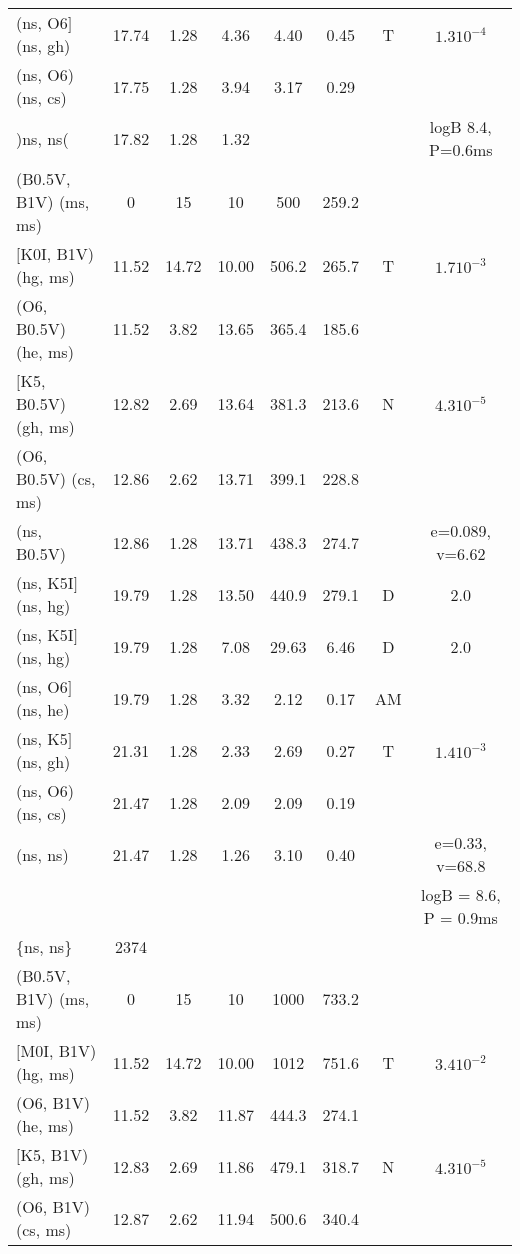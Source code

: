 \documentclass{article}
\begin{document}
\begin{table}
\begin{tabular}{p{4cm}ccccccc}
(ns, O6$]$ (ns, gh)	& 17.74	& 1.28	& 4.36 	& 4.40  & 0.45 	& T	& $1.3 10^{-4}$		\\
(ns, O6) (ns, cs)	& 17.75	& 1.28	& 3.94 	& 3.17  & 0.29 	&  	&               	\\
)ns, ns(         	& 17.82	& 1.28	& 1.32 	&       &      	&  	& logB 8.4, P=0.6ms	\\
\hline
(B0.5V, B1V) (ms, ms)	& 0	& 15	& 10	& 500	& 259.2	&       &			\\
$[$K0I, B1V) (hg, ms)	& 11.52	& 14.72	& 10.00	& 506.2 & 265.7 & T	& $1.7 10^{-3}$		\\
(O6, B0.5V) (he, ms)	& 11.52	& 3.82	& 13.65	& 365.4	& 185.6	&  	&               	\\
$[$K5, B0.5V) (gh, ms)	& 12.82	& 2.69	& 13.64	& 381.3	& 213.6	& N	& $4.3 10^{-5}$		\\
(O6, B0.5V) (cs, ms)	& 12.86	& 2.62	& 13.71	& 399.1	& 228.8	&  	&              		\\
(ns, B0.5V)         	& 12.86	& 1.28	& 13.71	& 438.3	& 274.7	&  	&  e=0.089, v=6.62	\\
(ns, K5I$]$ (ns, hg)	& 19.79	& 1.28	& 13.50	& 440.9 & 279.1	& D	& 2.0         		\\
(ns, K5I$]$ (ns, hg)	& 19.79	& 1.28	& 7.08 	& 29.63 & 6.46 	& D	& 2.0         		\\
(ns, O6$]$ (ns, he)	& 19.79	& 1.28	& 3.32 	& 2.12  & 0.17 	& AM	&             		\\
(ns, K5$]$ (ns, gh)	& 21.31	& 1.28	& 2.33 	& 2.69  & 0.27 	& T	& $1.4 10^{-3}$		\\
(ns, O6) (ns, cs)	& 21.47	& 1.28	& 2.09 	& 2.09  & 0.19 	&  	&               	\\
(ns, ns)         	& 21.47	& 1.28	& 1.26 	& 3.10  & 0.40 	&  	& e=0.33, v=68.8   	\\
			&	& 	&	&	&	&   	& logB = 8.6, P = 0.9ms	\\
\{ns, ns\}       	& 2374 	&     	&      	&       &      	&  	&                  	\\
\hline
(B0.5V, B1V) (ms, ms)	& 0	& 15	& 10	& 1000	& 733.2	&       &			\\
$[$M0I, B1V) (hg, ms)	& 11.52	& 14.72	& 10.00	& 1012  & 751.6 & T	& $3.4 10^{-2}$		\\
(O6, B1V) (he, ms)	& 11.52	& 3.82	& 11.87	& 444.3	& 274.1	&  	&               	\\
$[$K5, B1V) (gh, ms)	& 12.83	& 2.69	& 11.86	& 479.1	& 318.7	& N	& $4.3 10^{-5}$		\\
(O6, B1V) (cs, ms)	& 12.87	& 2.62	& 11.94	& 500.6	& 340.4	&  	&              		\\

\end{tabular}
\end{table}
\end{document}
